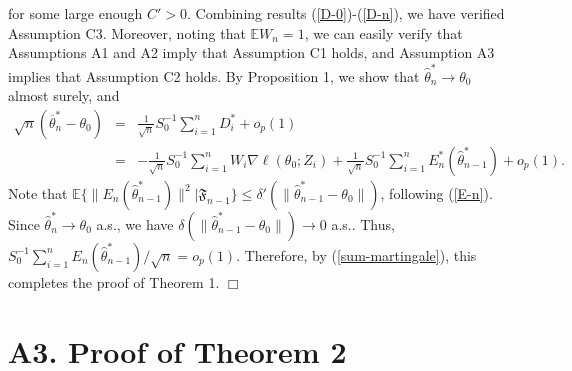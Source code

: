 \documentclass[twoside,11pt]{article}
\def\wh{\widehat}
\def\ol{\overline}
\begin{document}
for some large enough $C'>0$. Combining results (\ref{D-0})-(\ref{D-n}), we have verified Assumption C3. Moreover, noting that $\mathbb{E}W_n=1$, we can easily verify that Assumptions A1 and A2 imply that Assumption C1 holds, and Assumption A3 implies that Assumption C2 holds. By Proposition 1, we show that $\wh{\theta}^*_n\rightarrow\theta_0$ almost surely, and
\begin{eqnarray}\label{sum-martingale}
\sqrt{n}(\ol{\theta}_n^*-\theta_0)&=&\frac{1}{\sqrt{n}}S_0^{-1}\sum_{i=1}^n D_i^*+ o_p(1)\nonumber\\
&=& -\frac{1}{\sqrt{n}}S_0^{-1}\sum_{i=1}^n W_i \nabla \ell(\theta_0; Z_i)+\frac{1}{\sqrt{n}}S_0^{-1}\sum_{i=1}^n E^*_n(\wh{\theta}^*_{n-1})+o_p(1).
\end{eqnarray}
Note that $\mathbb{E}\{\|E_n(\wh{\theta}^*_{n-1})\|^2|\mathfrak{F}_{n-1}\}\leq \delta'(\|\wh{\theta}^*_{n-1}-\theta_0\|)$, following (\ref{E-n}). Since $\wh{\theta}^*_n\rightarrow\theta_0$ a.s., we have $\delta(\|\wh{\theta}^*_{n-1}-\theta_0\|)\rightarrow 0$ a.s.. Thus, $S_0^{-1}\sum_{i=1}^n E_n(\wh{\theta}^*_{n-1})/\sqrt{n}=o_p(1)$. Therefore, by (\ref{sum-martingale}), this completes the proof of Theorem 1. $\Box$

\section*{A3. Proof of Theorem 2}
\end{document}
